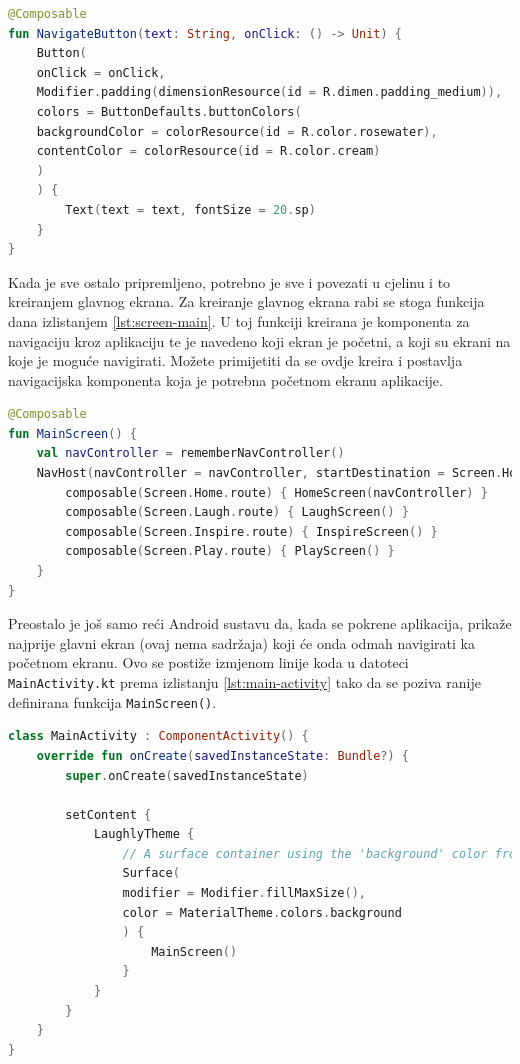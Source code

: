 \documentclass[11pt,a4paper,twoside]{article}
\begin{document}
\begin{lstlisting}[caption={Gumb za navigaciju - NavigateButton.kt}, label={lst:navigate-button}, language=Kotlin]
@Composable
fun NavigateButton(text: String, onClick: () -> Unit) {
	Button(
	onClick = onClick,
	Modifier.padding(dimensionResource(id = R.dimen.padding_medium)),
	colors = ButtonDefaults.buttonColors(
	backgroundColor = colorResource(id = R.color.rosewater),
	contentColor = colorResource(id = R.color.cream)
	)
	) {
		Text(text = text, fontSize = 20.sp)
	}
}
\end{lstlisting}

Kada je sve ostalo pripremljeno, potrebno je sve i povezati u cjelinu i to kreiranjem glavnog ekrana. Za kreiranje glavnog ekrana rabi se stoga funkcija dana izlistanjem \ref{lst:screen-main}. U toj funkciji kreirana je komponenta za navigaciju kroz aplikaciju te je navedeno koji ekran je početni, a koji su ekrani na koje je moguće navigirati. Možete primijetiti da se ovdje kreira i postavlja navigacijska komponenta koja je potrebna početnom ekranu aplikacije.

\begin{lstlisting}[caption={Glavni ekran - MainScreen.kt}, label={lst:screen-main}, language=Kotlin]
@Composable
fun MainScreen() {
	val navController = rememberNavController()
	NavHost(navController = navController, startDestination = Screen.Home.route) {
		composable(Screen.Home.route) { HomeScreen(navController) }
		composable(Screen.Laugh.route) { LaughScreen() }
		composable(Screen.Inspire.route) { InspireScreen() }
		composable(Screen.Play.route) { PlayScreen() }
	}
}
\end{lstlisting}

Preostalo je još samo reći Android sustavu da, kada se pokrene aplikacija, prikaže najprije glavni ekran (ovaj nema sadržaja) koji će onda odmah navigirati ka početnom ekranu. Ovo se postiže izmjenom linije koda u datoteci \texttt{MainActivity.kt} prema izlistanju \ref{lst:main-activity} tako da se poziva ranije definirana funkcija \texttt{MainScreen()}.

\begin{lstlisting}[caption={Glavna aktivnost - MainActivity.kt}, label={lst:activity-main}, language=Kotlin]
class MainActivity : ComponentActivity() {
	override fun onCreate(savedInstanceState: Bundle?) {
		super.onCreate(savedInstanceState)
		
		setContent {
			LaughlyTheme {
				// A surface container using the 'background' color from the theme
				Surface(
				modifier = Modifier.fillMaxSize(),
				color = MaterialTheme.colors.background
				) {
					MainScreen()
				}
			}
		}
	}
}
\end{lstlisting}
\end{document}

